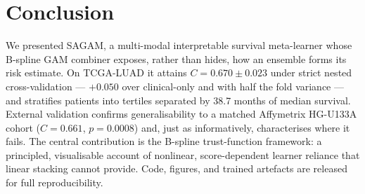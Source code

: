 \documentclass[journal]{IEEEtran}
\begin{document}
\section{Conclusion}
\label{sec:conclusion}
We presented SAGAM, a multi-modal interpretable survival meta-learner whose
B-spline GAM combiner exposes, rather than hides, how an ensemble forms its
risk estimate. On TCGA-LUAD it attains $C{=}0.670\pm0.023$ under strict nested
cross-validation --- $+0.050$ over clinical-only and with half the fold
variance --- and stratifies patients into tertiles separated by 38.7 months of
median survival. External validation confirms generalisability to a matched
Affymetrix HG-U133A cohort ($C{=}0.661$, $p{=}0.0008$) and, just as
informatively, characterises where it fails. The central contribution is the
B-spline trust-function framework: a principled, visualisable account of
nonlinear, score-dependent learner reliance that linear stacking cannot
provide. Code, figures, and trained artefacts are released for full
reproducibility.
\end{document}
